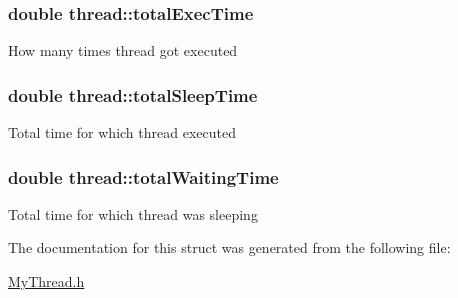 \hypertarget{structthread_a17b4aa92faed7890a53b692f90e55513}{
\subsubsection[{total\+Exec\+Time}]{\setlength{\rightskip}{0pt plus 5cm}double thread\+::total\+Exec\+Time}}\label{structthread_a17b4aa92faed7890a53b692f90e55513}
How many times thread got executed \hypertarget{structthread_aa57b83b2e1fe65e7772195eb8d7c733c}{
\subsubsection[{total\+Sleep\+Time}]{\setlength{\rightskip}{0pt plus 5cm}double thread\+::total\+Sleep\+Time}}\label{structthread_aa57b83b2e1fe65e7772195eb8d7c733c}
Total time for which thread executed \hypertarget{structthread_a35cc2bd19d37b55d551b7e1b3a184fae}{
\subsubsection[{total\+Waiting\+Time}]{\setlength{\rightskip}{0pt plus 5cm}double thread\+::total\+Waiting\+Time}}\label{structthread_a35cc2bd19d37b55d551b7e1b3a184fae}
Total time for which thread was sleeping 

The documentation for this struct was generated from the following file\+:\begin{DoxyCompactItemize}
\item 
\hyperlink{_my_thread_8h}{My\+Thread.\+h}\end{DoxyCompactItemize}

